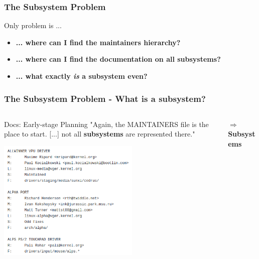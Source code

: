 \documentclass{beamer}
\begin{document}
	\begin{frame}
	\frametitle{The Subsystem Problem}
		\begin{alertblock}{Only problem is ...}
			\begin{itemize}
				\item \textbf{... where can I find the maintainers hierarchy?}
				\item \textbf{... where can I find the documentation on all subsystems?}
				\item \textbf{... what exactly \textit{is} a subsystem even?}
			\end{itemize}
		\end{alertblock}
	\end{frame}


	\begin{frame}
	\frametitle{The Subsystem Problem - What is a subsystem?}


	\begin{columns}
		\begin{column}{0.55\textwidth}
			\begin{block}{Docs: Early-stage Planning}
				"Again, the MAINTAINERS file is	the place to start. [...] not all \textbf{subsystems} are represented there."
			\end{block}
     		\includegraphics[width=0.6\textwidth]{pics/MAINTAINERSbild.png}
		\end{column}
		\begin{column}{0.5\textwidth}
			$\Rightarrow$ \textbf{Subsystems}
		\end{column}
	\end{columns}
	\end{frame}
\end{document}
